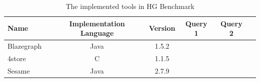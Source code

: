 \begin{table}[ht]
	\footnotesize
	\centering
	
	\begin{tabular}{ l c c c c c}
		\toprule
		Name & Implementation Language& Version & Query 1 & Query 2\\ 
		\midrule 
		Blazegraph~\cite{blaze} & Java  & 1.5.2 & \textbullet & \textbullet\\ \hline
		4store~\cite{4store} & C  & 1.1.5 & & \textbullet \\ \hline
		Sesame~\cite{sesame} & Java & 2.7.9 & \textbullet & \textbullet\\ \hline
		\bottomrule
	\end{tabular}
	\caption{The implemented tools in HG Benchmark}
	\label{tab:tools}
\end{table}



